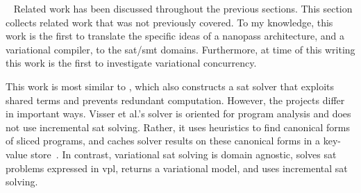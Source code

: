 ~\label{chapter:related-work}
Related work has been discussed throughout the previous sections. This section
collects related work that was not previously covered. To my knowledge, this
work is the first to translate the specific ideas of a nanopass architecture,
and a variational compiler, to the \ac{sat}/\ac{smt} domains. Furthermore, at
time of this writing this work is the first to investigate variational
concurrency.


%
This work is most similar to \cite{Visser:2012:GRR:2393596.2393665}, which also
constructs a \ac{sat} solver that exploits shared terms and prevents redundant
computation. However, the projects differ in important ways. Visser et al.'s
solver is oriented for program analysis and does not use incremental \ac{sat}
solving. Rather, it uses heuristics to find canonical forms of sliced programs,
and caches solver results on these canonical forms in a key-value
store~\cite{redis}. In contrast, variational \ac{sat} solving is domain
agnostic, solves \ac{sat} problems expressed in \ac{vpl}, returns a variational
model, and uses incremental \ac{sat} solving.


